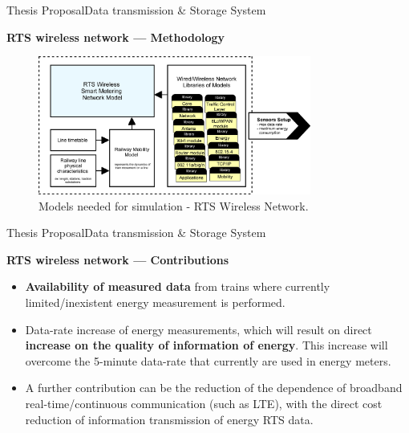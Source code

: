 \begin{frame}{Thesis Proposal}{Data transmission \& Storage System}
\begin{block}{\textbf{RTS wireless network --- Methodology}}

\begin{figure}[ht!]
	\centering
	\includegraphics[width=0.8\textwidth,keepaspectratio]{figures/40.Method/methodWireless}
	\caption{Models needed for simulation - RTS Wireless Network.}
\end{figure}

\end{block}
\end{frame}

\begin{frame}{Thesis Proposal}{Data transmission \& Storage System}
\begin{block}{\textbf{RTS wireless network --- Contributions}}
\begin{itemize}
\item \textbf{Availability of measured data} from trains where currently limited/inexistent energy measurement is performed.

\pause
\item Data-rate increase of energy measurements, which will result on direct \textbf{increase on the quality of information of energy}. This increase will overcome the 5-minute data-rate that currently are used in energy meters.

\pause
\item A further contribution can be the reduction of the dependence of broadband real-time/continuous communication (such as \ac{LTE}), with the direct cost reduction of information transmission of energy \ac{RTS} data.
\end{itemize}
\end{block}
\end{frame}

